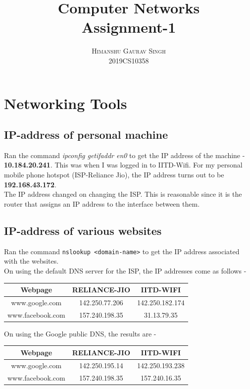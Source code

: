 \documentclass[a4paper]{article}
\title{\textbf{Computer Networks} \\
      Assignment-1 \\
}
\author{\textsc{Himanshu Gaurav Singh } \\
    2019CS10358
}
\begin{document}
\maketitle
\tableofcontents

\section{Networking Tools}

\subsection{IP-address of personal machine}
Ran the command \textit{ipconfig getifaddr en0} to get the IP address of the machine - \textbf{10.184.20.241}. This was when I was logged in to IITD-Wifi. For my personal mobile phone hotspot (ISP-Reliance Jio), the IP address turns out to be \textbf{192.168.43.172}.\\
The IP address changed on changing the ISP. This is reasonable since it is the router that assigns an IP address to the interface between them.

\subsection{IP-address of various websites}
Ran the command \texttt{nslookup \textless domain-name\textgreater} to get the IP address associated with the websites. \\
On using the default DNS server for the ISP, the IP addresses come as follows - \\
\begin{center}
    \begin{tabular}{|c|c|c|}
        \hline
        Webpage & RELIANCE-JIO  & IITD-WIFI  \\  
        \hline
        www.google.com     & 142.250.77.206   & 142.250.182.174   \\ 
        \hline
        www.facebook.com       &  157.240.198.35  & 31.13.79.35  \\  
        \hline
    \end{tabular}
\end{center}

On using the Google public DNS, the results are - \\
\begin{center}
    \begin{tabular}{|c|c|c|}
        \hline
        Webpage & RELIANCE-JIO  & IITD-WIFI  \\  
        \hline
        www.google.com  & 142.250.195.14   &  142.250.193.238   \\ 
        \hline
        www.facebook.com       &  157.240.198.35 & 157.240.16.35  \\  
        \hline
    \end{tabular}
\end{center}
\end{document}
